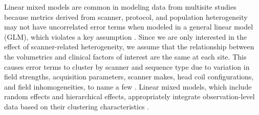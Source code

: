 Linear mixed models are common in modeling data from multisite studies because metrics derived from scanner, protocol, and population heterogeneity may not have uncorrelated error terms when modeled in a general linear model (GLM), which violates a key assumption \cite{garson2013fundamentals}. Since we are only interested in the effect of scanner-related heterogeneity, we assume that the relationship between the volumetrics and clinical factors of interest are the same at each site. This causes error terms to cluster by scanner and sequence type due to variation in field strengths, acquisition parameters, scanner makes, head coil configurations, and field inhomogeneities, to name a few \cite{cannon2014}. Linear mixed models, which include random effects and hierarchical effects, appropriately integrate observation-level data based on their clustering characteristics \cite{garson2013fundamentals}.